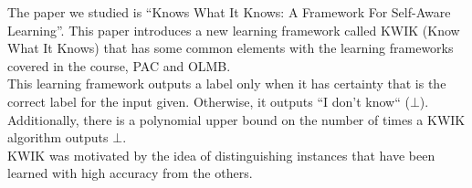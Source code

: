 The paper we studied is ``Knows What It Knows: A Framework For Self-Aware Learning''\cite{KWIK}.
This paper introduces a new learning framework called KWIK (Know What It Knows) that has some common elements with 
the learning frameworks covered in the course, PAC and OLMB.\\

This learning framework outputs a label only when it has certainty that is the correct label for the input given. Otherwise, it outputs
``I don't know`` ($\bot$). Additionally, there is a polynomial upper bound on the number of times a KWIK algorithm outputs $\bot$.\\

KWIK was motivated by the idea of distinguishing instances that have been learned with high accuracy from the others.
